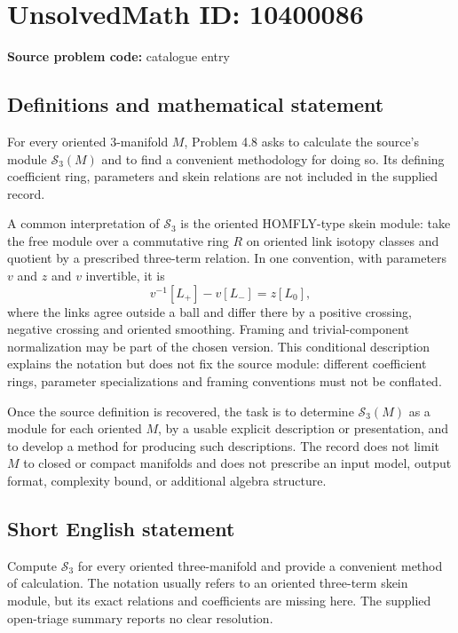 \documentclass[11pt]{article}
\begin{document}
\section*{UnsolvedMath ID: 10400086}
\textbf{Source problem code:} catalogue entry
\subsection{Definitions and mathematical statement}
For every oriented \(3\)-manifold \(M\), Problem 4.8 asks to calculate the source's module \(\mathcal S_3(M)\) and to find a convenient methodology for doing so. Its defining coefficient ring, parameters and skein relations are not included in the supplied record.

A common interpretation of \(\mathcal S_3\) is the oriented HOMFLY-type skein module: take the free module over a commutative ring \(R\) on oriented link isotopy classes and quotient by a prescribed three-term relation. In one convention, with parameters \(v\) and \(z\) and \(v\) invertible, it is
\[
 v^{-1}[L_+]-v[L_-]=z[L_0],
\]
where the links agree outside a ball and differ there by a positive crossing, negative crossing and oriented smoothing. Framing and trivial-component normalization may be part of the chosen version. This conditional description explains the notation but does not fix the source module: different coefficient rings, parameter specializations and framing conventions must not be conflated.

Once the source definition is recovered, the task is to determine \(\mathcal S_3(M)\) as a module for each oriented \(M\), by a usable explicit description or presentation, and to develop a method for producing such descriptions. The record does not limit \(M\) to closed or compact manifolds and does not prescribe an input model, output format, complexity bound, or additional algebra structure.
\subsection{Short English statement}
Compute \(\mathcal S_3\) for every oriented three-manifold and provide a convenient method of calculation. The notation usually refers to an oriented three-term skein module, but its exact relations and coefficients are missing here. The supplied open-triage summary reports no clear resolution.
\end{document}
